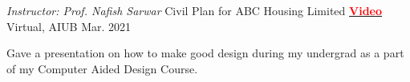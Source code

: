 

\begin{cventries}

  \cventry
    {\textit{Instructor: Prof. Nafish Sarwar}} %
    {Civil Plan for ABC Housing Limited  \href{https://youtu.be/iwKYPq6e4lU}{\hspace{0.5em} \textcolor{red}{\fontsize{8}{10}\textbf{Video}}}} %
    {Virtual, AIUB} %
    {Mar. 2021} %
    {
      \begin{cvitems} %
        \item {Gave a presentation on how to make good design during my undergrad as a part of my Computer Aided Design Course.}
      \end{cvitems}
    }

\end{cventries}
